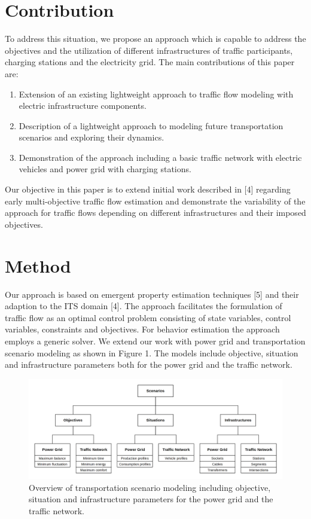 \documentclass[conference]{IEEEtran}
\begin{document}
\section{Contribution}
To address this situation, we propose an approach which is capable to address the objectives and the utilization of different infrastructures of traffic participants, charging stations and the electricity grid. The main contributions of this paper are:
\begin{enumerate}
  \item Extension of an existing lightweight approach to traffic flow modeling
  with electric infrastructure components.
  \item Description of a lightweight approach to modeling future
transportation scenarios and exploring their dynamics.
  \item Demonstration of the approach including a basic traffic network
with electric vehicles and power grid with charging stations.
\end{enumerate}
Our objective in this paper is to extend initial work described in [4] regarding
early multi-objective traffic flow estimation and demonstrate the variability of the approach for traffic flows depending on different infrastructures and their imposed objectives.

\section{Method}
Our approach is based on emergent property estimation techniques [5] and their adaption to the ITS domain [4]. The approach facilitates the formulation of traffic flow as an optimal control problem consisting of state variables, control variables, constraints and objectives. For behavior estimation the approach employs a generic solver.
We extend our work with power grid and transportation scenario modeling as shown in Figure 1. The models include objective, situation and infrastructure parameters both for the power grid and the traffic network.

\begin{figure}[h]
	\centering
	\includegraphics[width=0.925\columnwidth]{gfx/approach.png}
	\caption{Overview of transportation scenario modeling including objective, situation and infrastructure parameters for the power grid and the traffic network.}
	\label{fig:approach}
\end{figure}
\end{document}
